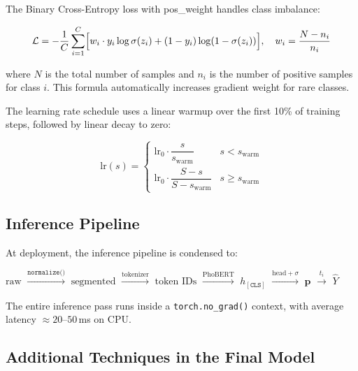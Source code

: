 \documentclass[12pt, a4paper]{report}
\begin{document}
The Binary Cross-Entropy loss with pos\_weight handles class imbalance:

\begin{equation}
  \mathcal{L} = -\frac{1}{C}\sum_{i=1}^{C}
  \Bigl[ w_i \cdot y_i \log\sigma(z_i)
       + (1 - y_i)\log(1-\sigma(z_i)) \Bigr],
  \quad w_i = \frac{N - n_i}{n_i}
\label{eq:bce_loss}
\end{equation}

where $N$ is the total number of samples and $n_i$ is the number of positive samples
for class $i$. This formula automatically increases gradient weight for rare classes.

The learning rate schedule uses a linear warmup over the first 10\% of training steps,
followed by linear decay to zero:

\begin{equation}
  \text{lr}(s) =
  \begin{cases}
    \text{lr}_0 \cdot \dfrac{s}{s_\mathrm{warm}} & s < s_\mathrm{warm} \\[6pt]
    \text{lr}_0 \cdot \dfrac{S - s}{S - s_\mathrm{warm}} & s \geq s_\mathrm{warm}
  \end{cases}
\label{eq:lr_schedule}
\end{equation}

\subsection{Inference Pipeline}
\label{subsec:approach3_inference}

At deployment, the inference pipeline is condensed to:

\begin{center}
$\text{raw}$
$\xrightarrow{\texttt{normalize()}}$
$\text{segmented}$
$\xrightarrow{\text{tokenizer}}$
$\text{token IDs}$
$\xrightarrow{\text{PhoBERT}}$
$h_{[\texttt{CLS}]}$
$\xrightarrow{\text{head}+\sigma}$
$\mathbf{p}$
$\xrightarrow{t_i}$
$\hat{Y}$
\end{center}

The entire inference pass runs inside a \texttt{torch.no\_grad()} context,
with average latency $\approx 20$--$50$\,ms on CPU.

\subsection{Additional Techniques in the Final Model}
\label{subsec:approach3_tricks}
\end{document}
